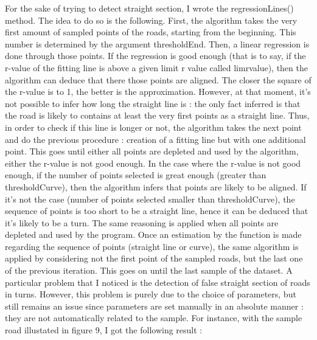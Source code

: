 \documentclass[a4paper,12pt,fleqn]{article}
\begin{document}
For the sake of trying to detect straight section, I wrote the regressionLines() method. The idea to do so is the following. First, the algorithm takes the very first amount of sampled points of the roads, starting from the beginning. This number is determined by the argument thresholdEnd. Then, a linear regression is done through those points. If the regression is good enough (that is to say, if the r-value of the fitting line is above a given limit r value called limrvalue), then the algorithm can deduce that there those points are aligned. The closer the square of the r-value is to 1, the better is the approximation. However, at that moment, it's not possible to infer how long the straight line is : the only fact inferred is that the road is likely to contains at least the very first points as a straight line. Thus, in order to check if this line is longer or not, the algorithm takes the next point and do the previous procedure : creation of a fitting line but with one additional point. This goes until either all points are depleted and used by the algorithm, either the r-value is not good enough. In the case where the r-value is not good enough, if the number of points selected is great enough (greater than thresholdCurve), then the algorithm infers that points are likely to be aligned. If it's not the case (number of points selected smaller than thresholdCurve),  the sequence of points is too short to be a straight line, hence it can be deduced that it's likely to be a turn. The same reasoning is applied when all points are depleted and used by the program. Once an estimation by the function is made regarding the sequence of points (straight line or curve), the same algorithm is applied by considering not the first point of the sampled roads, but the last one of the previous iteration. This goes on until the last sample of the dataset.
\newline
 \newline
 A particular problem that I noticed is the detection of false straight section of roads in turns. However, this problem is purely due to the choice of parameters, but still remains an issue since parameters are set manually in an absolute manner : they are not automatically related to the sample. For instance, with the sample road illustated in figure 9, I got the following result :
\end{document}
